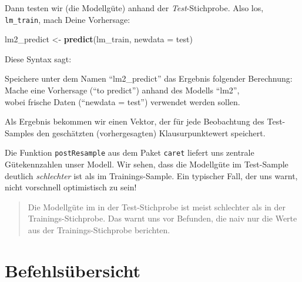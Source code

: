 \documentclass[12pt,ngerman,]{book}
\makeatletter
\newenvironment{Shaded}{\begin{snugshade}}{\end{snugshade}}
\newcommand{\KeywordTok}[1]{\textcolor[rgb]{0.13,0.29,0.53}{\textbf{{#1}}}}
\newcommand{\DataTypeTok}[1]{\textcolor[rgb]{0.13,0.29,0.53}{{#1}}}
\newcommand{\StringTok}[1]{\textcolor[rgb]{0.31,0.60,0.02}{{#1}}}
\newcommand{\CommentTok}[1]{\textcolor[rgb]{0.56,0.35,0.01}{\textit{{#1}}}}
\newcommand{\NormalTok}[1]{{#1}}
\newenvironment{kframe}{%
\medskip{}
\setlength{\fboxsep}{.8em}
 \def\at@end@of@kframe{}%
 \ifinner\ifhmode%
  \def\at@end@of@kframe{\end{minipage}}%
  \begin{minipage}{\columnwidth}%
 \fi\fi%
 \def\FrameCommand##1{\hskip\@totalleftmargin \hskip-\fboxsep
 \colorbox{shadecolor}{##1}\hskip-\fboxsep
     \hskip-\linewidth \hskip-\@totalleftmargin \hskip\columnwidth}%
 \MakeFramed {\advance\hsize-\width
   \@totalleftmargin\z@ \linewidth\hsize
   \@setminipage}}%
 {\par\unskip\endMakeFramed%
 \at@end@of@kframe}
\renewenvironment{Shaded}{\begin{kframe}}{\end{kframe}}
\theoremstyle{definition}
\theoremstyle{definition}
\theoremstyle{remark}
\let\BeginKnitrBlock\begin \let\EndKnitrBlock\end
\makeatother
\begin{document}
Dann testen wir (die Modellgüte) anhand der \emph{Test}-Stichprobe. Also
los, \texttt{lm\_train}, mach Deine Vorhersage:

\begin{Shaded}
\begin{Highlighting}[]
\NormalTok{lm2_predict <-}\StringTok{ }\KeywordTok{predict}\NormalTok{(lm_train, }\DataTypeTok{newdata =} \NormalTok{test)}
\end{Highlighting}
\end{Shaded}

Diese Syntax sagt:

\BeginKnitrBlock{rmdpseudocode}
Speichere unter dem Namen ``lm2\_predict'' das Ergebnis folgender
Berechnung:\\
Mache eine Vorhersage (``to predict'') anhand des Modells ``lm2'',\\
wobei frische Daten (``newdata = test'') verwendet werden sollen.
\EndKnitrBlock{rmdpseudocode}

Als Ergebnis bekommen wir einen Vektor, der für jede Beobachtung des
Test-Samples den geschätzten (vorhergesagten) Klausurpunktewert
speichert.

\begin{Shaded}
\end{Shaded}

Die Funktion \texttt{postResample} aus dem Paket \texttt{caret} liefert
uns zentrale Gütekennzahlen unser Modell. Wir sehen, dass die Modellgüte
im Test-Sample deutlich \emph{schlechter} ist als im Trainings-Sample.
Ein typischer Fall, der uns warnt, nicht vorschnell optimistisch zu
sein!

\begin{quote}
Die Modellgüte im in der Test-Stichprobe ist meist schlechter als in der
Trainings-Stichprobe. Das warnt uns vor Befunden, die naiv nur die Werte
aus der Trainings-Stichprobe berichten.
\end{quote}

\section{Befehlsübersicht}\label{befehlsubersicht-6}
\end{document}
